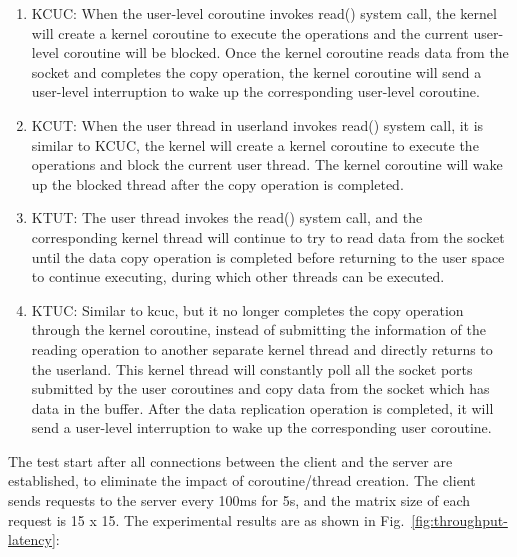 \documentclass[sigconf,review,anonymous]{acmart}
\begin{document}
\begin{enumerate}[leftmargin=*]
    \item KCUC: When the user-level coroutine invokes read() system call, the kernel will create a kernel coroutine to execute the operations and the current user-level coroutine will be blocked. Once the kernel coroutine reads data from the socket and completes the copy operation, the kernel coroutine will send a user-level interruption to wake up the corresponding user-level coroutine.
    \item KCUT: When the user thread in userland invokes read() system call, it is similar to KCUC, the kernel will create a kernel coroutine to execute the operations and block the current user thread. The kernel coroutine will wake up the blocked thread after the copy operation is completed.
    \item KTUT: The user thread invokes the read() system call, and the corresponding kernel thread will continue to try to read data from the socket until the data copy operation is completed before returning to the user space to continue executing, during which other threads can be executed.
    \item KTUC: Similar to kcuc, but it no longer completes the copy operation through the kernel coroutine, instead of submitting the information of the reading operation to another separate kernel thread and directly returns to the userland. This kernel thread will constantly poll all the socket ports submitted by the user coroutines and copy data from the socket which has data in the buffer. After the data replication operation is completed, it will send a user-level interruption to wake up the corresponding user coroutine.
\end{enumerate}


The test start after all connections between the client and the server are established, to eliminate the impact of coroutine/thread creation. The client sends requests to the server every 100ms for 5s, and the matrix size of each request is 15 x 15. The experimental results are as shown in Fig.~\ref{fig:throughput-latency}:
\end{document}
